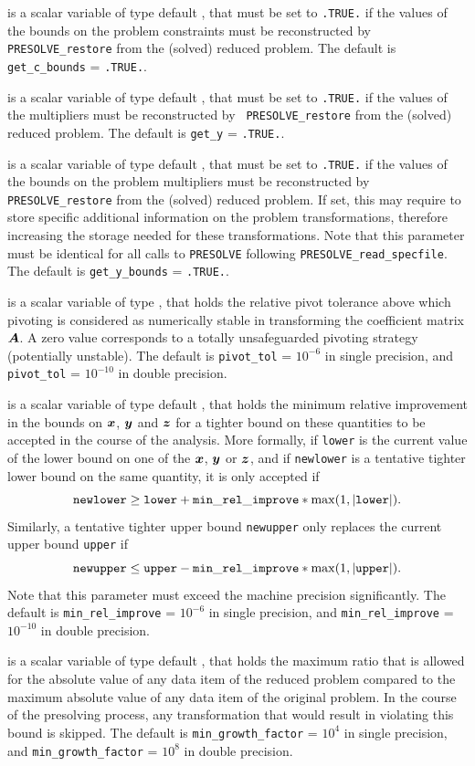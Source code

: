 \documentclass{galahad}
\newcommand{\packagename}{PRESOLVE}
\begin{document}
\begin{description}
 is a scalar variable of type default \logical, that
must be set to {\tt .TRUE.} if the values of the bounds on the
problem constraints must be reconstructed by {\tt \packagename\_restore}
from the (solved) reduced problem.
The default is {\tt get\_c\_bounds} = {\tt .TRUE.}.

 is a scalar variable of type default \logical, that
must be set to {\tt .TRUE.} if the values of the multipliers
must be reconstructed by {\tt
\packagename\_restore} from the (solved) reduced problem.
The default is {\tt get\_y} = {\tt .TRUE.}.

 is a scalar variable of type default \logical, that
must be set to {\tt .TRUE.} if the values of the bounds on the
problem multipliers must be reconstructed by {\tt \packagename\_restore}
from the (solved) reduced problem.
If set, this may require to store specific
additional information on the problem transformations,
therefore increasing the storage needed for these transformations.
Note that this parameter must be identical for all calls to
{\tt \packagename} following {\tt \packagename\_read\_specfile}.
The default is {\tt get\_y\_bounds} = {\tt .TRUE.}.

 is a scalar variable of type \realdp, that
holds the relative pivot tolerance above which pivoting is
considered as numerically stable in transforming the
coefficient matrix ${\bm{A}}$.  A zero value corresponds to a
totally unsafeguarded pivoting strategy (potentially unstable).
The default is {\tt pivot\_tol} = $10^{-6}$ in single precision, and
{\tt pivot\_tol} = $10^{-10}$ in double precision.

  is a scalar variable of type default
\realdp, that holds the minimum relative improvement in the bounds on ${\bm{x}}$,
${\bm{y}}$ and ${\bm{z}}$ for a tighter bound on these quantities to be
accepted in the course of the analysis.  More formally,
if {\tt lower} is the current value of the lower bound on one
of the ${\bm{x}}$, ${\bm{y}}$ or ${\bm{z}}$, and if {\tt newlower} is a tentative tighter
lower bound on the same quantity, it is only accepted if
\[
{\tt newlower} \geq
{\tt lower} + {\tt min\_rel\_improve} * \max( 1, |{\tt lower}|).
\]
Similarly, a tentative tighter upper bound {\tt newupper}
only replaces the current upper bound {\tt upper} if
\[
{\tt newupper} \leq
{\tt upper} - {\tt min\_rel\_improve} * \max( 1, |{\tt upper}|).
\]
Note that this parameter must exceed the machine precision significantly.
The default is {\tt min\_rel\_improve} = $10^{-6}$ in single
precision, and {\tt min\_rel\_improve} = $10^{-10}$ in double
precision.

 is a scalar variable of type default
\realdp, that holds the maximum ratio that is allowed for the absolute
value of any data item of the reduced problem compared to the maximum
absolute value of any data item of the original problem.  In the
course of the presolving process, any transformation that would result in
violating this bound is skipped.
The default is {\tt min\_growth\_factor} = $10^{4}$ in single
precision, and {\tt min\_growth\_factor} = $10^{8}$ in double
precision.

\end{description}
\end{document}
